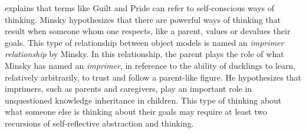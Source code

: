 \cite{minsky:2006} explains that terms like Guilt and Pride can refer
to self-conscious ways of thinking.  Minsky hypothesizes that there
are powerful ways of thinking that result when someone whom one
respects, like a parent, values or devalues their goals.  This type of
relationship between object models is named an \emph{imprimer
  relationship} by Minsky.  In this relationship, the parent plays the
role of what Minsky has named an \emph{imprimer}, in reference to the
ability of ducklings to learn, relatively arbitrarily, to trust and
follow a parent-like figure.  He hypothesizes that imprimers, such as
parents and caregivers, play an important role in unquestioned
knowledge inheritance in children.  This type of thinking about what
someone else is thinking about their goals may require at least two
recursions of self-reflective abstraction and thinking.

